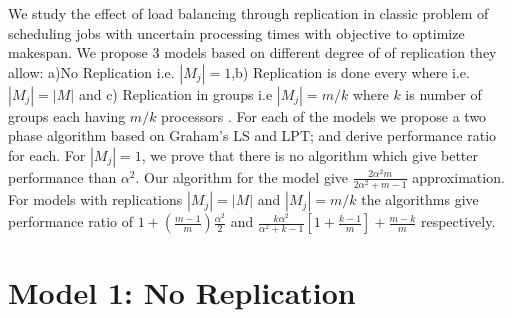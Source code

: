 \documentclass[10pt, conference, compsocconf]{IEEEtran}
\begin{document}
We study the effect of load balancing through replication in classic problem of scheduling jobs with uncertain processing times with objective to optimize makespan. We propose 3 models based on different degree of of
replication they allow: a)No Replication i.e. $|M_j|=1 $,b) Replication is done every where i.e.$|M_j|=|M|$ and c) Replication in groups i.e $|M_j|= m/k$  where $k$ is number of groups each having $m/k$ processors . For each of the models we propose a two phase algorithm based on Graham's LS and LPT; and derive performance ratio for each. For $|M_j|=1 $, we prove that there is no algorithm which give better performance than $\alpha^2$. Our algorithm for the model give $\frac{2\alpha^{2}m}{2\alpha^{2}+ m-1}$ approximation. For models with replications $|M_j|=|M|$ and $|M_j|= m/k$ the algorithms give performance
ratio of $ 1 + (\frac{m-1}{m})\frac{\alpha^{2}}{2}$ and $\frac{k\alpha^{2}}{\alpha^{2}+k-1}\left[1+ {\frac{k-1}{m}} \right]+ {\frac{m-k}{m}}$ respectively.

\section{Model 1: No Replication} 
\end{document}
